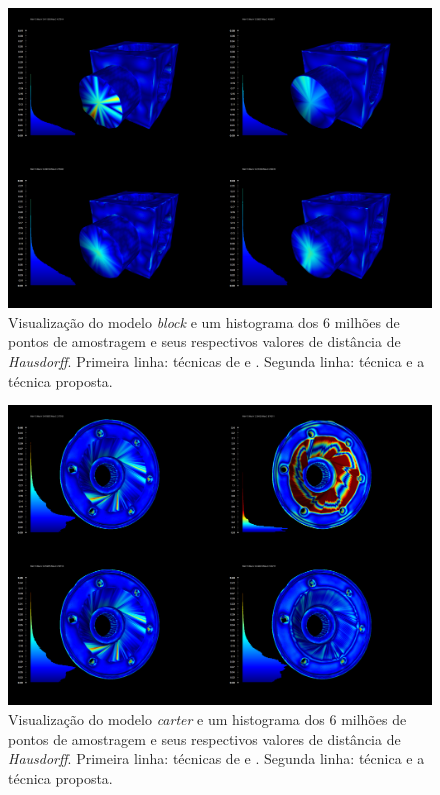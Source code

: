 \clearpage






\begin{figure}[p]
\captionsetup{width=\linewidth}
\centering
\includegraphics[width=16cm]{figuras/block_hausdorff_final.png}
\caption{Visualização do modelo \textit{block} e um histograma dos 6 milhões de pontos de amostragem e seus respectivos valores de distância de \textit{Hausdorff}. Primeira linha: técnicas de \cite{zhang2015guided} e \cite{sun2007fast}. Segunda linha: técnica \cite{zheng2011bilateral} e a técnica proposta.}
\label{fig:block_hausdorff_final}
\end{figure}

\clearpage


\begin{figure}[p]
\captionsetup{width=\linewidth}
\centering
\includegraphics[width=16cm]{figuras/carter_hausdorff_final.png}
\caption{Visualização do modelo \textit{carter} e um histograma dos 6 milhões de pontos de amostragem e seus respectivos valores de distância de \textit{Hausdorff}. Primeira linha: técnicas de \cite{zhang2015guided} e \cite{sun2007fast}. Segunda linha: técnica \cite{zheng2011bilateral} e a técnica proposta.}
\label{fig:carter_hausdorff_final}
\end{figure}

